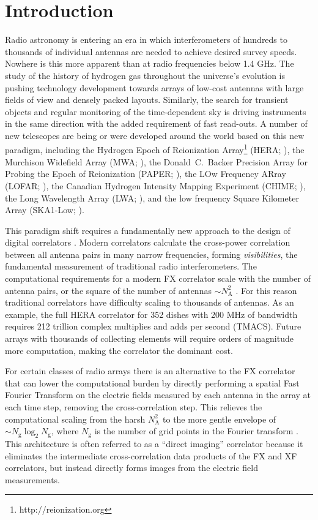 \documentclass[a4paper,fleqn,usenatbib]{mnras}
\newcommand{\Nant}{N_\textrm{A}}
\newcommand{\Ngrid}{N_\textrm{g}}
\begin{document}

\section{Introduction}

Radio astronomy is entering an era in which interferometers of hundreds to thousands of individual antennas are needed to achieve desired survey speeds. Nowhere is this more apparent than at radio frequencies below 1.4 GHz. The study of the history of hydrogen gas throughout the universe's evolution is pushing technology development towards arrays of low-cost antennas with large fields of view and densely packed layouts. Similarly, the search for transient objects and regular monitoring of the time-dependent sky is driving instruments in the same direction with the added requirement of fast read-outs. A number of new telescopes are being or were developed around the world based on this new paradigm, including the Hydrogen Epoch of Reionization Array\footnote{http://reionization.org} (HERA; \citealt{deb16}), the Murchison Widefield Array (MWA; \citealt{tin13,bow13}), the Donald~C.~Backer Precision Array for Probing the Epoch of Reionization (PAPER; \citealt{par10}), the LOw Frequency ARray (LOFAR; \citealt{van13}), the Canadian Hydrogen Intensity Mapping Experiment (CHIME; \citealt{ban14}), the Long Wavelength Array (LWA; \citealt{ell13}), and the low frequency Square Kilometer Array (SKA1-Low; \citealt{mel13}).

This paradigm shift requires a fundamentally new approach to the design of
digital correlators \citep{lon00}. Modern correlators calculate the cross-power
correlation between all antenna pairs in many narrow frequencies, forming
\emph{visibilities}, the fundamental measurement of traditional radio
interferometers. The computational requirements for a modern FX correlator scale
with the number of antenna pairs, or the square of the number of antennas $\sim
\Nant^2$ \citep{bun04}. For this reason traditional correlators have difficulty
scaling to thousands of antennas. As an example, the full HERA correlator for
352 dishes with 200 MHz of bandwidth requires 212 trillion complex multiplies
and adds per second (TMACS). Future arrays with thousands of collecting elements
will require orders of magnitude more computation, making the correlator the
dominant cost.

For certain classes of radio arrays there is an alternative to the FX correlator
that can lower the computational burden by directly performing a spatial Fast
Fourier Transform \citep[FFT;][]{coo65} on the electric fields measured by each 
antenna in the array at each time step, removing the cross-correlation step. 
This relieves the computational scaling from the harsh $\Nant^2$ to the more 
gentle envelope of $\sim\Ngrid\log_2\Ngrid$, where $\Ngrid$ is the number of 
grid points in the Fourier transform \citep[e.g.][]{mor11,teg09,teg10}. This 
architecture is often referred to as a ``direct imaging'' correlator because it 
eliminates the intermediate cross-correlation data products of the FX and XF 
correlators, but instead directly forms images from the electric field 
measurements.
\end{document}
